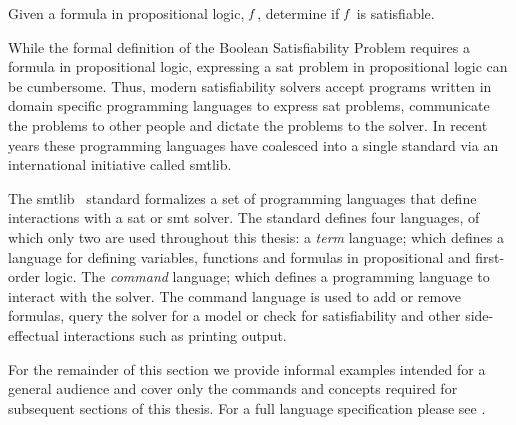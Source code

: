 \begin{definition}
  Given a formula in propositional logic, $\mathit{f}$, determine if $\mathit{f}$ is
  satisfiable.
\end{definition}

While the formal definition of the Boolean Satisfiability Problem requires a
formula in propositional logic, expressing a \ac{sat} problem in propositional
logic can be cumbersome. Thus, modern satisfiability solvers accept programs
written in domain specific programming languages to express \ac{sat} problems,
communicate the problems to other people and dictate the problems to the solver.
In recent years these programming languages have coalesced into a single
standard via an international initiative called \acl{smtlib}.

The \acl{smtlib}~\cite{BarFT-SMTLIB} standard formalizes a set of programming
languages that define interactions with a \ac{sat} or \ac{smt} solver. The
standard defines four languages, of which only two are used throughout this
thesis: a \emph{term} language; which defines a language for defining variables,
functions and formulas in propositional and first-order logic. The
\emph{command} language; which defines a programming language to interact with
the solver. The command language is used to add or remove formulas, query the
solver for a model or check for satisfiability and other side-effectual
interactions such as printing output.

For the remainder of this section we provide informal examples intended for a
general audience and cover only the commands and concepts required for
subsequent sections of this thesis. For a full language specification please see
\citet{BarFT-SMTLIB}.

